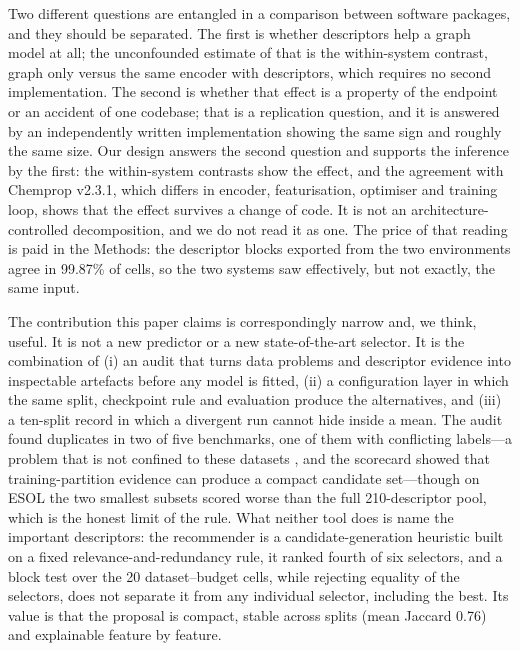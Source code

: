 Two different questions are entangled in a comparison between software packages, and they should be separated. The first is whether descriptors help a graph model at all; the unconfounded estimate of that is the within-system contrast, graph only versus the same encoder with descriptors, which requires no second implementation. The second is whether that effect is a property of the endpoint or an accident of one codebase; that is a replication question, and it is answered by an independently written implementation showing the same sign and roughly the same size. Our design answers the second question and supports the inference by the first: the within-system contrasts show the effect, and the agreement with Chemprop v2.3.1, which differs in encoder, featurisation, optimiser and training loop, shows that the effect survives a change of code. It is not an architecture-controlled decomposition, and we do not read it as one. The price of that reading is paid in the Methods: the descriptor blocks exported from the two environments agree in 99.87\% of cells, so the two systems saw effectively, but not exactly, the same input.

The contribution this paper claims is correspondingly narrow and, we think, useful. It is not a new predictor or a new state-of-the-art selector. It is the combination of (i) an audit that turns data problems and descriptor evidence into inspectable artefacts before any model is fitted, (ii) a configuration layer in which the same split, checkpoint rule and evaluation produce the alternatives, and (iii) a ten-split record in which a divergent run cannot hide inside a mean. The audit found duplicates in two of five benchmarks, one of them with conflicting labels---a problem that is not confined to these datasets \cite{schuh2026audit}, and the scorecard showed that training-partition evidence can produce a compact candidate set---though on ESOL the two smallest subsets scored worse than the full 210-descriptor pool, which is the honest limit of the rule. What neither tool does is name the important descriptors: the recommender is a candidate-generation heuristic built on a fixed relevance-and-redundancy rule, it ranked fourth of six selectors, and a block test over the 20 dataset--budget cells, while rejecting equality of the selectors, does not separate it from any individual selector, including the best. Its value is that the proposal is compact, stable across splits (mean Jaccard 0.76) and explainable feature by feature.

